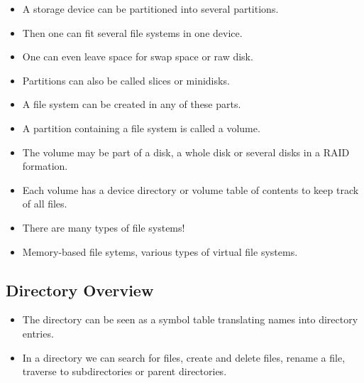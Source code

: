 \documentclass{beamer}
\begin{document}
\begin{frame}{\insertsubsectionhead}
  \begin{itemize}
    \item A storage device can be partitioned into several partitions.
    \item Then one can fit several file systems in one device.
    \item One can even leave space for swap space or raw disk.
    \item Partitions can also be called slices or minidisks.
    \item A file system can be created in any of these parts.
    \item A partition containing a file system is called a volume.
    \item The volume may be part of a disk, a whole disk or several disks in 
      a RAID formation.
    \item Each volume has a device directory or volume table of contents to 
      keep track of all files.
  \end{itemize}
\end{frame}

\begin{frame}{\insertsubsectionhead}
  \begin{itemize}
    \item There are many types of file systems!
    \item Memory-based file sytems, various types of virtual file systems.
  \end{itemize}
\end{frame}

\subsection{Directory Overview}

\begin{frame}{\insertsubsectionhead}
  \begin{itemize}
    \item The directory can be seen as a symbol table translating names into 
      directory entries.

    \item In a directory we can search for files, create and delete files, 
      rename a file, traverse to subdirectories or parent directories.

  \end{itemize}
\end{frame}
\end{document}
